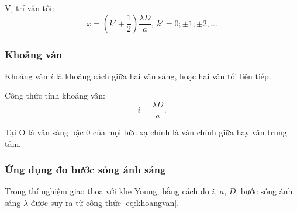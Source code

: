 Vị trí vân tối: 
\begin{equation}
	x=\left(k'+\dfrac{1}{2}\right) \dfrac{\lambda D}{a},\ k'=0; \pm 1; \pm 2,... 
\end{equation}


\subsubsection{Khoảng vân}
Khoảng vân $i$ là khoảng cách giữa hai vân sáng, hoặc hai vân tối liên tiếp.

Công thức tính khoảng vân: 
\begin{equation}\label{eq:khoangvan}	
	i=\dfrac{\lambda D}{a}.	
\end{equation}

Tại O là vân sáng bậc 0 của mọi bức xạ chính là vân chính giữa hay vân trung tâm.

\subsubsection {Ứng dụng đo bước sóng ánh sáng}
Trong thí nghiệm giao thoa với khe Young, bằng cách đo $i$, $a$, $D$, bước sóng ánh sáng $\lambda$ được suy ra từ công thức \eqref{eq:khoangvan}.
